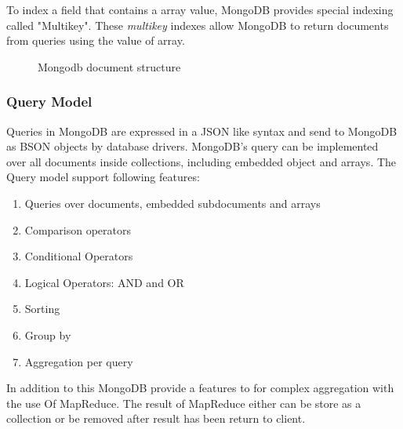 To index a field that contains a array value, MongoDB provides special indexing called "Multikey". These \textit{multikey} indexes allow MongoDB to return documents from queries using the value of array. 
\begin{figure}
	\centering
	\centering
	\caption{Mongodb document structure}
	\label{fig:mongodb-doc}
	
\end{figure}

\subsubsection{Query Model}
Queries in MongoDB are expressed in a JSON like syntax and send to MongoDB as BSON objects by database drivers\cite{orend2010analysis}. MongoDB's query can be implemented over all documents inside collections, including embedded object and arrays. 
The Query model support following features:
\begin{enumerate}
	\item Queries over documents, embedded subdocuments and arrays
	\item Comparison operators
	\item Conditional Operators
	\item Logical Operators: AND and OR
	\item Sorting 
	\item Group by 
	\item Aggregation per query
\end{enumerate}
In addition to this MongoDB provide a features to for complex aggregation with the use Of MapReduce. The result of MapReduce either can be store as a collection or be removed after result has been return to client\cite{orend2010analysis}.